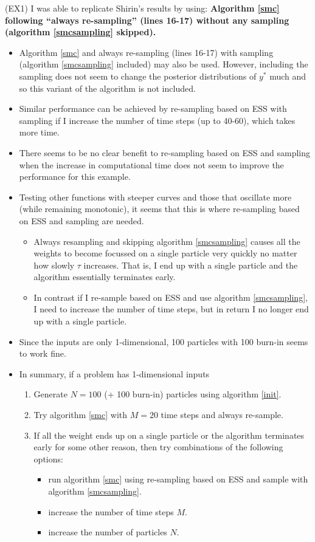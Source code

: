 \documentclass{sfuthesis}
\begin{document}
(EX1) I was able to replicate Shirin's results by using: \textbf{Algorithm \ref{smc} following ``always re-sampling'' (lines 16-17) without any sampling (algorithm \ref{smcsampling} skipped).}

\bigskip

\begin{itemize}
  \item Algorithm \ref{smc} and always re-sampling (lines 16-17) with sampling (algorithm \ref{smcsampling} included) may also be used. However, including the sampling does not seem to change the posterior distributions of $y^*$ much and so this variant of the algorithm is not included.
  \item Similar performance can be achieved by re-sampling based on ESS with sampling if I increase the number of time steps (up to 40-60), which takes more time. 
  \item There seems to be no clear benefit to re-sampling based on ESS and sampling when the increase in computational time does not seem to improve the performance for this example.
  \item Testing other functions with steeper curves and those that oscillate more (while remaining monotonic), it seems that this is where re-sampling based on ESS and sampling are needed. 
  
  \begin{itemize}
    \item Always resampling and skipping algorithm \ref{smcsampling} causes all the weights to become focussed on a single particle very quickly no matter how slowly $\tau$ increases. That is, I end up with a single particle and the algorithm essentially terminates early. 
    \item In contrast if I re-sample based on ESS and use algorithm \ref{smcsampling}, I need to increase the number of time steps, but in return I no longer end up with a single particle. 
  \end{itemize}
  
  \item Since the inputs are only 1-dimensional, 100 particles with 100 burn-in seems to work fine.
  \item In summary, if a problem has 1-dimensional inputs

  \begin{enumerate}
    \item Generate $N = 100$ (+ 100 burn-in) particles using algorithm \ref{init}.
    \item Try algorithm \ref{smc} with $M = 20$ time steps and always re-sample.
    \item If all the weight ends up on a single particle or the algorithm terminates early for some other reason, then try combinations of the following options:
    \begin{itemize}
      \item run algorithm \ref{smc} using re-sampling based on ESS and sample with algorithm \ref{smcsampling}. 
      \item increase the number of time steps $M$. 
      \item increase the number of particles $N$. 
    \end{itemize}


\end{enumerate}
\end{itemize}
\end{document}
